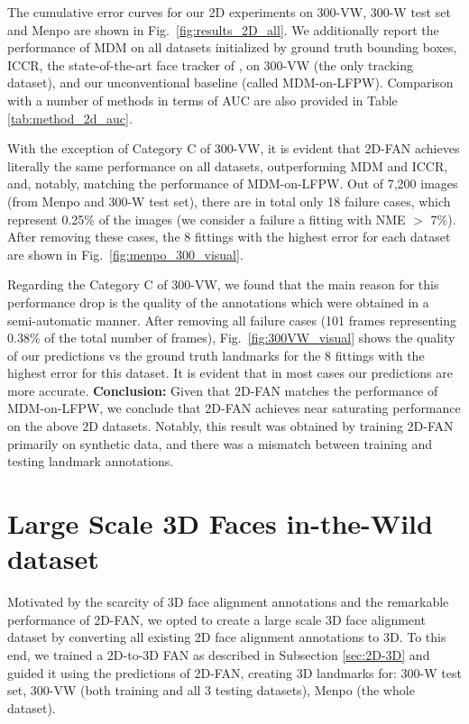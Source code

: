 The cumulative error curves for our 2D experiments on 300-VW, 300-W test set and Menpo are shown in Fig.~\ref{fig:results_2D_all}. We additionally report the performance of MDM on all datasets initialized by ground truth bounding boxes, ICCR, the state-of-the-art face tracker of \cite{sanchez2016cascaded}, on 300-VW (the only tracking dataset), and our unconventional baseline (called MDM-on-LFPW). Comparison with a number of methods in terms of AUC are also provided in Table \ref{tab:method_2d_auc}.

	With the exception of Category C of 300-VW, it is evident that 2D-FAN achieves literally the same performance on all datasets, outperforming MDM and ICCR, and, notably, matching the performance of MDM-on-LFPW. Out of 7,200 images (from Menpo and 300-W test set), there are in total only 18 failure cases, which represent 0.25\% of the images (we consider a failure a fitting with NME $>$ 7\%). After removing these cases, the 8 fittings with the highest error for each dataset are shown in Fig.~\ref{fig:menpo_300_visual}.  

	Regarding the Category C of 300-VW, we found that the main reason for this performance drop is the quality of the annotations which were obtained in a semi-automatic manner. After removing all failure cases (101 frames representing 0.38\% of the total number of frames), Fig.~\ref{fig:300VW_visual} shows the quality of our predictions vs the ground truth landmarks for the 8 fittings with the highest error for this dataset. It is evident that in most cases our predictions are more accurate.   
	\textbf{Conclusion:} Given that 2D-FAN matches the performance of MDM-on-LFPW, we conclude that 2D-FAN achieves near saturating performance on the above 2D datasets. Notably, this result was obtained by training 2D-FAN primarily on synthetic data, and there was a mismatch between training and testing landmark annotations.

	\section{Large Scale 3D Faces in-the-Wild dataset} \label{sec:large_scale}

	Motivated by the scarcity of 3D face alignment annotations and the remarkable performance of 2D-FAN, we opted to create a large scale 3D face alignment dataset by converting all existing 2D face alignment annotations to 3D. To this end, we trained a 2D-to-3D FAN as described in Subsection \ref{sec:2D-3D} and guided it using the predictions of 2D-FAN, creating 3D landmarks for: 300-W test set, 300-VW (both training and all 3 testing datasets), Menpo (the whole dataset).

